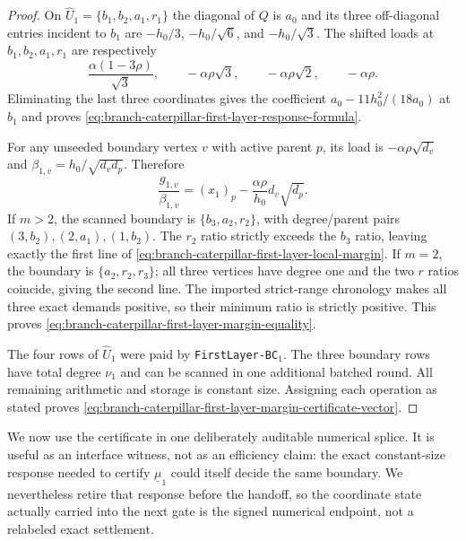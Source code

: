 \begin{proof}
On $\widehat U_1=\{b_1,b_2,a_1,r_1\}$ the diagonal of $Q$ is $a_0$ and its
three off-diagonal entries incident to $b_1$ are
$-h_0/3$, $-h_0/\sqrt6$, and $-h_0/\sqrt3$.  The shifted loads at
$b_1,b_2,a_1,r_1$ are respectively
\[
 \frac{\alpha(1-3\rho)}{\sqrt3},\qquad
 -\alpha\rho\sqrt3,\qquad
 -\alpha\rho\sqrt2,\qquad
 -\alpha\rho.
\]
Eliminating the last three coordinates gives the coefficient
$a_0-11h_0^2/(18a_0)$ at $b_1$ and proves
\cref{eq:branch-caterpillar-first-layer-response-formula}.

For any unseeded boundary vertex $v$ with active parent $p$, its load is
$-\alpha\rho\sqrt{d_v}$ and
$\beta_{1,v}=h_0/\sqrt{d_vd_p}$.  Therefore
\begin{equation}
 \frac{g_{1,v}}{\beta_{1,v}}
 =(x_1)_p-\frac{\alpha\rho}{h_0}d_v\sqrt{d_p}.
 \label{eq:branch-caterpillar-first-layer-margin-ratio}
\end{equation}
If $m>2$, the scanned boundary is $\{b_3,a_2,r_2\}$, with degree/parent
pairs $(3,b_2),(2,a_1),(1,b_2)$.  The $r_2$ ratio strictly exceeds the
$b_3$ ratio, leaving exactly the first line of
\cref{eq:branch-caterpillar-first-layer-local-margin}.  If $m=2$, the
boundary is $\{a_2,r_2,r_3\}$; all three vertices have degree one and the
two $r$ ratios coincide, giving the second line.  The imported strict-range
chronology makes all three exact demands positive, so their minimum ratio is
strictly positive.  This proves
\cref{eq:branch-caterpillar-first-layer-margin-equality}.

The four rows of $\widehat U_1$ were paid by
\texttt{FirstLayer-BC}$_1$.  The three boundary rows have total degree
$\nu_1$ and can be scanned in one additional batched round.  All remaining
arithmetic and storage is constant size.  Assigning each operation as stated
proves
\cref{eq:branch-caterpillar-first-layer-margin-certificate-vector}.
\end{proof}

We now use the certificate in one deliberately auditable numerical splice.
It is useful as an interface witness, not as an efficiency claim: the exact
constant-size response needed to certify $\underline\mu_1$ could itself
decide the same boundary.  We nevertheless retire that response before the
handoff, so the coordinate state actually carried into the next gate is the
signed numerical endpoint, not a relabeled exact settlement.

